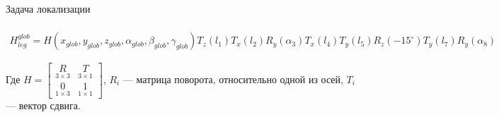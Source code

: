 \documentclass[aspectratio=169,xcolor=table,10pt]{beamer}
\begin{document}
\begin{frame}[t]{Задача локализации}
\framesubtitle{}
\begin{multline}
        H_{leg}^{glob} = H(x_{glob},y_{glob},z_{glob},\alpha_{glob},\beta_{glob},\gamma_{glob})T_z(l_1)T_x(l_2)R_y(\alpha_3)T_x(l_4)T_y(l_5)R_z(-15^{\circ})T_y(l_7)R_y(\alpha_8)
\end{multline}

\vspace{-0.3cm}
Где $H = \begin{bmatrix}
    \underset{3 \times 3}{R} & \underset{3 \times 1}{T} \\
    \underset{1 \times 3}{0} & \underset{1 \times 1}{1}
\end{bmatrix}$, $R_i$ --- матрица поворота, относительно одной из осей, $T_i$ --- вектор сдвига.

    \begin{columns}[T,onlytextwidth]
        \begin{column}{0.69\textwidth}
            
            \vspace{-0.3cm}
            \begin{figure}[H]
        \centering
\end{figure}
\end{column}
\end{columns}
\end{frame}
\end{document}
